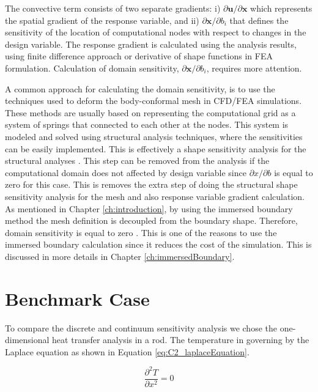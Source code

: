 The convective term consists of two separate gradients: i) $\partial \mathbf{u} / \partial \mathbf{x}$ which represents the spatial gradient of the response variable, and ii) $\partial \mathbf{x} / \partial b_i$ that defines the sensitivity of the location of computational nodes with respect to changes in the design variable. The response gradient is calculated using the analysis results, using finite difference approach or derivative of shape functions in FEA formulation. Calculation of domain sensitivity, $\partial \mathbf{x} / \partial b_i$, requires more attention.

A common approach for calculating the domain sensitivity, is to use the techniques used to deform the body-conformal mesh in CFD/FEA simulations. These methods are usually based on representing the computational grid as a system of springs that connected to each other at the nodes. This system is modeled and solved using structural analysis techniques, where the sensitivities can be easily implemented. This is effectively a shape sensitivity analysis for the structural analyses \cite{haftka1986structural}. This step can be removed from the analysis if the computational domain does not affected by design variable since $\partial x/\partial b$ is equal to zero for this case. This is removes the extra step of doing the structural shape sensitivity analysis for the mesh and also response variable gradient calculation. As mentioned in Chapter \ref{ch:introduction}, by using the immersed boundary method the mesh definition is decoupled from the boundary shape. Therefore, domain sensitivity is equal to zero \cite{gobal2014continuum}. This is one of the reasons to use the immersed boundary calculation since it reduces the cost of the simulation. This is discussed in more details in Chapter \ref{ch:immersedBoundary}.

\section{Benchmark Case}
To compare the discrete and continuum sensitivity analysis we chose the one-dimensional heat transfer analysis in a rod. The temperature in governing by the Laplace equation as shown in Equation \eqref{eq:C2_laplaceEquation}.

\begin{equation}\label{eq:C2_laplaceEquation}
	\frac{\partial^2 T}{\partial x^2} = 0
\end{equation}

